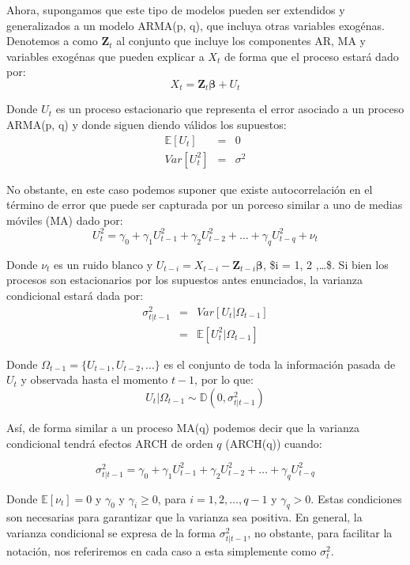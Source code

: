 \documentclass[
  a4paper,
]{article}
\begin{document}
Ahora, supongamos que este tipo de modelos pueden ser extendidos y
generalizados a un modelo ARMA(p, q), que incluya otras variables
exogénas. Denotemos a como \(\mathbf{Z}_t\) al conjunto que incluye los
componentes AR, MA y variables exogénas que pueden explicar a \(X_t\) de
forma que el proceso estará dado por: \[
    X_t = \mathbf{Z}_t \boldsymbol{\beta} + U_t
\]

Donde \(U_t\) es un proceso estacionario que representa el error
asociado a un proceso ARMA(p, q) y donde siguen diendo válidos los
supuestos: \begin{eqnarray*}
    \mathbb{E}[U_t] & = & 0 \\
    Var[U_t^2] & = & \sigma^2
\end{eqnarray*}

No obstante, en este caso podemos suponer que existe autocorrelación en
el término de error que puede ser capturada por un porceso similar a uno
de medias móviles (MA) dado por: \[
    U_t^2 = \gamma_0 + \gamma_1 U_{t-1}^2 + \gamma_2 U_{t-2}^2 + \ldots + \gamma_q U_{t-q}^2 + \nu_t
\]

Donde \(\nu_t\) es un ruido blanco y
\(U_{t-i} = X_{t-i} - \mathbf{Z}_{t-i} \boldsymbol{\beta}\), \$i = 1, 2
,\ldots \$. Si bien los procesos son estacionarios por los supuestos
antes enunciados, la varianza condicional estará dada por:
\begin{eqnarray*}
    \sigma^2_{t | t-1} & = & Var[ U_t | \Omega_{t-1} ] \\
    & = & \mathbb{E}[ U^2_t | \Omega_{t-1} ]
\end{eqnarray*}

Donde \(\Omega_{t-1} = \{U_{t-1}, U_{t-2}, \ldots \}\) es el conjunto de
toda la información pasada de \(U_t\) y observada hasta el momento
\(t-1\), por lo que: \begin{equation*}
    U_t | \Omega_{t-1} \sim \mathbb{D}(0, \sigma^2_{t | t-1})
\end{equation*}

Así, de forma similar a un proceso MA(q) podemos decir que la varianza
condicional tendrá efectos ARCH de orden \(q\) (ARCH(q)) cuando:

\[
  \sigma^2_{t|t-1} = \gamma_0 + \gamma_1 U_{t-1}^2 + \gamma_2 U_{t-2}^2 + \ldots + \gamma_q U_{t-q}^2
    \label{ARCH_Effect}
\]

Donde \(\mathbb{E}[\nu_t] = 0\) y \(\gamma_0\) y \(\gamma_i \geq 0\),
para \(i = 1, 2, \ldots, q-1\) y \(\gamma_q > 0\). Estas condiciones son
necesarias para garantizar que la varianza sea positiva. En general, la
varianza condicional se expresa de la forma \(\sigma^2_{t | t-1}\), no
obstante, para facilitar la notación, nos referiremos en cada caso a
esta simplemente como \(\sigma^2_{t}\).
\end{document}
